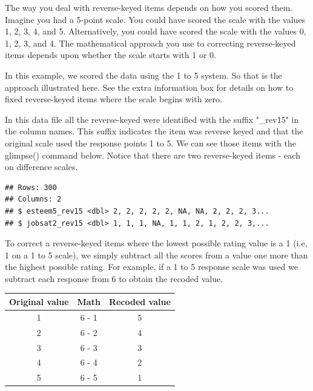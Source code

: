\documentclass[
]{krantz}
\makeatletter
\newenvironment{Shaded}{\begin{snugshade}}{\end{snugshade}}
\newcommand{\KeywordTok}[1]{\textcolor[rgb]{0.27,0.27,0.27}{\textbf{#1}}}
\newcommand{\NormalTok}[1]{#1}
\newcommand{\OperatorTok}[1]{\textcolor[rgb]{0.43,0.43,0.43}{\textbf{#1}}}
\newcommand{\StringTok}[1]{\textcolor[rgb]{0.5,0.5,0.5}{#1}}
\newenvironment{kframe}{%
\medskip{}
\setlength{\fboxsep}{.8em}
 \def\at@end@of@kframe{}%
 \ifinner\ifhmode%
  \def\at@end@of@kframe{\end{minipage}}%
  \begin{minipage}{\columnwidth}%
 \fi\fi%
 \def\FrameCommand##1{\hskip\@totalleftmargin \hskip-\fboxsep
 \colorbox{shadecolor}{##1}\hskip-\fboxsep
     \hskip-\linewidth \hskip-\@totalleftmargin \hskip\columnwidth}%
 \MakeFramed {\advance\hsize-\width
   \@totalleftmargin\z@ \linewidth\hsize
   \@setminipage}}%
 {\par\unskip\endMakeFramed%
 \at@end@of@kframe}
\renewenvironment{Shaded}{\begin{kframe}}{\end{kframe}}
\makeatother
\begin{document}
The way you deal with reverse-keyed items depends on how you scored them. Imagine you had a 5-point scale. You could have scored the scale with the values 1, 2, 3, 4, and 5. Alternatively, you could have scored the scale with the values 0, 1, 2, 3, and 4. The mathematical approach you use to correcting reverse-keyed items depends upon whether the scale starts with 1 or 0.

In this example, we scored the data using the 1 to 5 system. So that is the approach illustrated here. See the extra information box for details on how to fixed reverse-keyed items where the scale begins with zero.

In this data file all the reverse-keyed were identified with the suffix "\_rev15" in the column names. This suffix indicates the item was reverse keyed and that the original scale used the response points 1 to 5. We can see those items with the glimpse() command below. Notice that there are two reverse-keyed items - each on difference scales.

\begin{Shaded}
\end{Shaded}

\begin{verbatim}
## Rows: 300
## Columns: 2
## $ esteem5_rev15 <dbl> 2, 2, 2, 2, 2, NA, NA, 2, 2, 2, 3...
## $ jobsat2_rev15 <dbl> 1, 1, 1, NA, 1, 1, 2, 1, 2, 2, 3,...
\end{verbatim}

To correct a reverse-keyed items where the lowest possible rating value is a 1 (i.e, 1 on a 1 to 5 scale), we simply subtract all the scores from a value one more than the highest possible rating. For example, if a 1 to 5 response scale was used we subtract each response from 6 to obtain the recoded value.

\begin{longtable}[]{@{}ccc@{}}
\toprule
Original value & Math & Recoded value\tabularnewline
\midrule
\endhead
1 & 6 - 1 & 5\tabularnewline
2 & 6 - 2 & 4\tabularnewline
3 & 6 - 3 & 3\tabularnewline
4 & 6 - 4 & 2\tabularnewline
5 & 6 - 5 & 1\tabularnewline
\bottomrule
\end{longtable}
\end{document}

